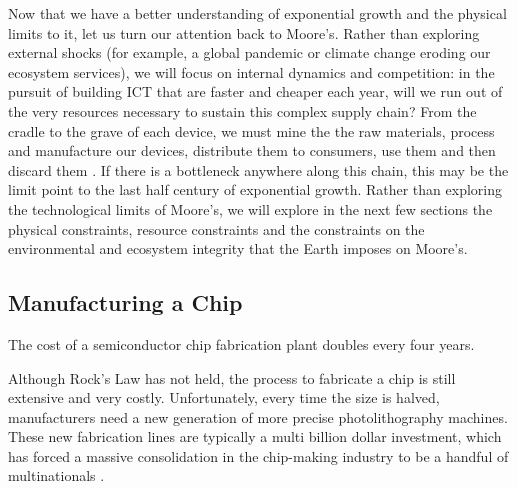 \documentclass{article}
\begin{document}
Now that we have a better understanding of exponential growth and the physical limits to it, let us turn our attention back to Moore's. 
Rather than exploring external shocks (for example, a global pandemic or climate change eroding our ecosystem services), we will focus on internal dynamics and competition: in the pursuit of building ICT that are faster and cheaper each year, will we run out of the very resources necessary to sustain this complex supply chain? From the cradle to the grave of each device, we must mine the the raw materials, process and manufacture our devices, distribute them to consumers, use them and then discard them \cite{andrae2015life}. If there is a bottleneck anywhere along this chain, this may be the limit point to the last half century of exponential growth. Rather than exploring the technological limits of Moore's, we will explore in the next few sections the physical constraints, resource constraints and the constraints on the environmental and ecosystem integrity that the Earth imposes on Moore's.
 
 
\subsection{Manufacturing a Chip} \label{SECTION_PRODUCTION}
 \begin{fquote}
 The cost of a semiconductor chip fabrication plant doubles every four years.
 \end{fquote}

Although Rock's Law %
has not held, the process to fabricate a chip is still extensive and very costly. Unfortunately, every time the size is halved, manufacturers need a new generation of more precise photolithography machines. These new fabrication lines are typically a multi billion dollar investment, which has forced a massive consolidation in the chip-making industry to be a handful of multinationals \cite{waldrop2016chips}.
\end{document}
